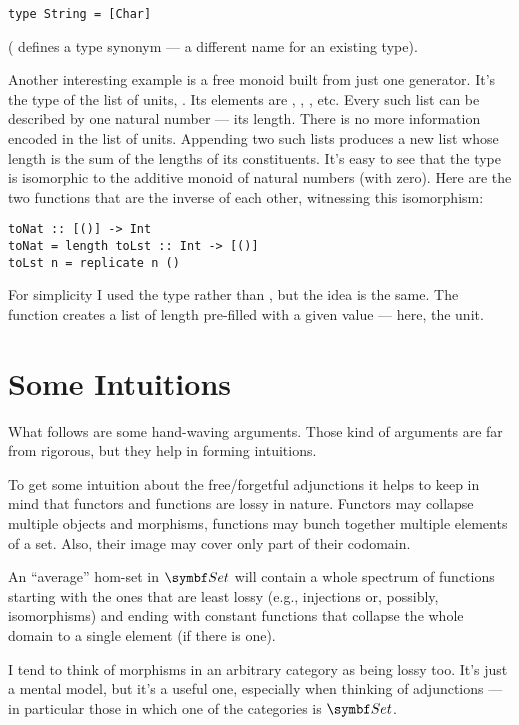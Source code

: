 \begin{Verbatim}
type String = [Char]
\end{Verbatim}
( defines a type synonym --- a different name for an
existing type).

Another interesting example is a free monoid built from just one
generator. It's the type of the list of units, \code{{[}(){]}}. Its
elements are \code{{[}{]}}, \code{{[}(){]}}, \code{{[}(), (){]}},
etc. Every such list can be described by one natural number --- its
length. There is no more information encoded in the list of units.
Appending two such lists produces a new list whose length is the sum of
the lengths of its constituents. It's easy to see that the type
\code{{[}(){]}} is isomorphic to the additive monoid of natural
numbers (with zero). Here are the two functions that are the inverse of
each other, witnessing this isomorphism:

\begin{Verbatim}
toNat :: [()] -> Int
toNat = length toLst :: Int -> [()]
toLst n = replicate n ()
\end{Verbatim}
For simplicity I used the type  rather than
, but the idea is the same. The function
 creates a list of length  pre-filled with a
given value --- here, the unit.

\section{Some Intuitions}\label{some-intuitions}

What follows are some hand-waving arguments. Those kind of arguments are
far from rigorous, but they help in forming intuitions.

To get some intuition about the free/forgetful adjunctions it helps to
keep in mind that functors and functions are lossy in nature. Functors
may collapse multiple objects and morphisms, functions may bunch
together multiple elements of a set. Also, their image may cover only
part of their codomain.

An ``average'' hom-set in $\Set$ will contain a whole spectrum of
functions starting with the ones that are least lossy (e.g., injections
or, possibly, isomorphisms) and ending with constant functions that
collapse the whole domain to a single element (if there is one).

I tend to think of morphisms in an arbitrary category as being lossy
too. It's just a mental model, but it's a useful one, especially when
thinking of adjunctions --- in particular those in which one of the
categories is $\Set$.

